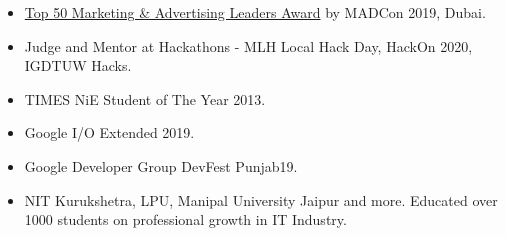 



\begin{itemize}
    \item  \color{LightGrey} \color{mecol}\href{https://drive.google.com/drive/folders/1W8HZmATotqPVJcRV8dol9LuKinMlSWxu?usp=sharing }{Top 50 Marketing \& Advertising Leaders Award} \color{LightGrey}by MADCon 2019,  Dubai.
    
      \item Judge and Mentor at Hackathons - MLH Local Hack Day, HackOn 2020,  IGDTUW Hacks.
      
      \item  TIMES NiE Student of The Year 2013.
    
    \end{itemize}
    

\begin{itemize}
      \item  Google I/O Extended 2019. 
    \item   Google Developer Group DevFest Punjab19.
   
    
    \item NIT Kurukshetra, LPU, Manipal University Jaipur and more. Educated over 1000 students on professional growth in IT Industry.  
    
    \end{itemize}

  
  
 \newline 

  \newline
{} \newline
{}  \newline
{}  \newline
{} \newline

